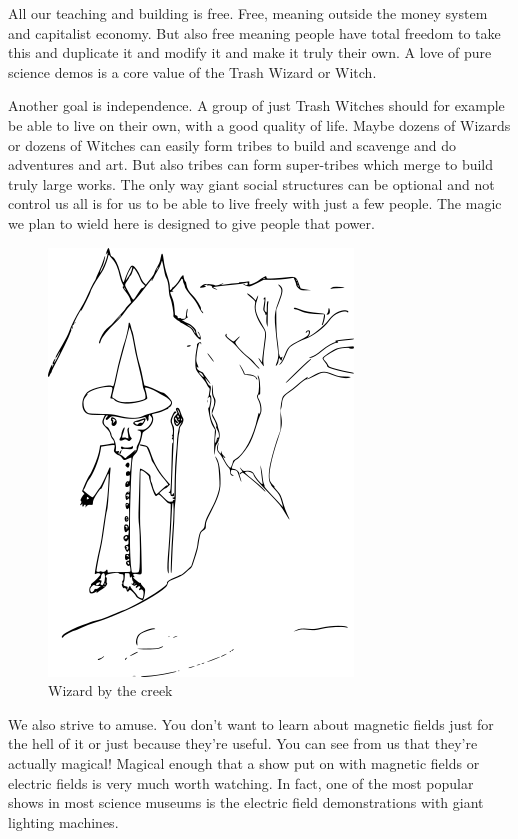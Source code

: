 All our teaching and building is free. Free, meaning outside the money
system and capitalist economy. But also free meaning people have total
freedom to take this and duplicate it and modify it and make it truly
their own. A love of pure science demos is a core value of the Trash
Wizard or Witch.

Another goal is independence. A group of just Trash Witches should for
example be able to live on their own, with a good quality of life. Maybe
dozens of Wizards or dozens of Witches can easily form tribes to build
and scavenge and do adventures and art. But also tribes can form
super-tribes which merge to build truly large works. The only way giant
social structures can be optional and not control us all is for us to be
able to live freely with just a few people. The magic we plan to wield
here is designed to give people that power.

\begin{figure}[htbp]
\centering
\includegraphics{images/wizardcartoon.png}
\caption{Wizard by the creek}
\end{figure}

We also strive to amuse. You don't want to learn about magnetic fields
just for the hell of it or just because they're useful. You can see from
us that they're actually magical! Magical enough that a show put on with
magnetic fields or electric fields is very much worth watching. In fact,
one of the most popular shows in most science museums is the electric
field demonstrations with giant lighting machines.

